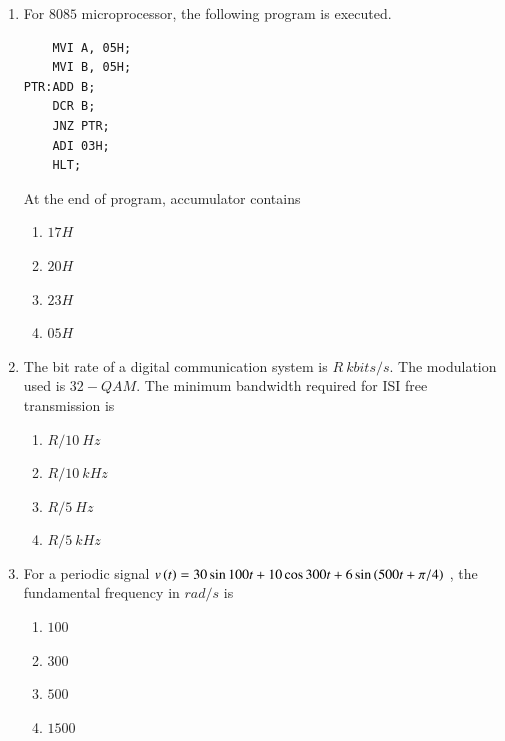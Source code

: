 \documentclass[journal,12pt,onecolumn]{IEEEtran}
\theoremstyle{remark}
\begin{document}
\begin{enumerate}
\item For $8085$ microprocessor, the following program is executed.
\begin{verbatim}
    MVI A, 05H;
    MVI B, 05H;
PTR:ADD B;
    DCR B;
    JNZ PTR;
    ADI 03H;
    HLT;
\end{verbatim}
At the end of program, accumulator contains
\begin{multicols}{4}
    \begin{enumerate}
        \item $17H$
        \item $20H$
        \item $23H$
        \item $05H$
    \end{enumerate}
\end{multicols}
\hfill {}

\item The bit rate of a digital communication system is $R\ kbits/s$. The modulation used is $32-QAM$. The minimum bandwidth required for ISI free transmission is
\begin{multicols}{4}
    \begin{enumerate}
        \item $R/10 \ Hz$
        \item $R/10 \ kHz$
        \item $R/5 \ Hz$
        \item $R/5 \ kHz$
    \end{enumerate}
\end{multicols}
\hfill {}

\item For a periodic signal $v\left(t\right) = 30 \sin 100 t +10 \cos 300 t + 6 \sin \left(500 t + \pi / 4\right)$ , the fundamental frequency in $rad/s$ is
\begin{multicols}{4}
    \begin{enumerate}
        \item $100$
        \item $300$
        \item $500$
        \item $1500$
    \end{enumerate}
\end{multicols}
\hfill {}


\end{enumerate}
\end{document}
